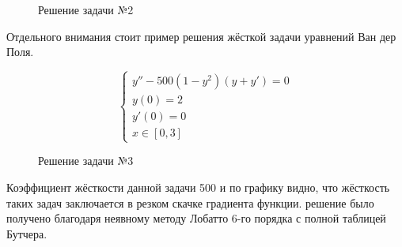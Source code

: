 \begin{figure}
    
    \caption{Решение задачи №2}
    \label{fig:task2}
\end{figure}

Отдельного внимания стоит пример решения жёсткой задачи уравнений Ван дер Поля.

$$
\begin{cases}
    y'' - 500(1 - y^2)(y + y') = 0\\
    y(0) = 2\\
    y'(0) = 0\\
    x \in [0, 3]
\end{cases}
$$

\begin{figure}
    
    \caption{Решение задачи №3}
    \label{fig:task3}
\end{figure}

Коэффициент жёсткости данной задачи 500 и по графику видно, что жёсткость таких задач заключается в резком скачке градиента функции.
решение было получено благодаря неявному методу Лобатто 6-го порядка с полной таблицей Бутчера.

